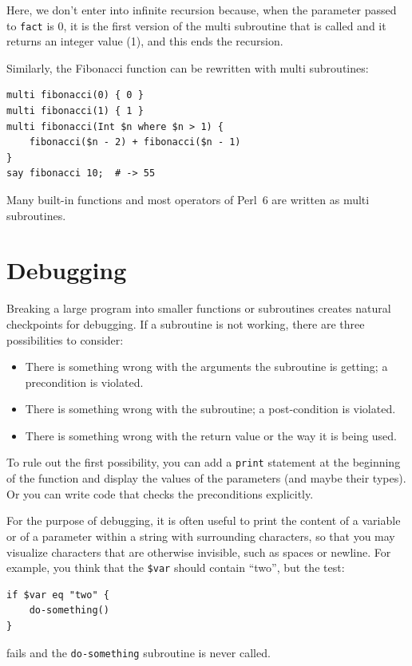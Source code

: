 Here, we don't enter into infinite recursion because, when 
the parameter passed to {\tt fact} is 0, it is the first 
version of the multi subroutine that is called and it returns 
an integer value (1), and this ends the recursion.

Similarly, the Fibonacci function can be rewritten with 
multi subroutines:


\begin{verbatim}
multi fibonacci(0) { 0 }
multi fibonacci(1) { 1 }
multi fibonacci(Int $n where $n > 1) { 
    fibonacci($n - 2) + fibonacci($n - 1) 
}
say fibonacci 10;  # -> 55
\end{verbatim}

Many built-in functions and most operators of Perl~6 are 
written as multi subroutines.

\section{Debugging}
\label{factdebug}

Breaking a large program into smaller functions or subroutines 
creates natural checkpoints for debugging.  If a subroutine 
is not working, there are three possibilities to consider:

\begin{itemize}

\item There is something wrong with the arguments the subroutine
is getting; a precondition is violated.

\item There is something wrong with the subroutine; a post-condition
is violated.

\item There is something wrong with the return value or the
way it is being used.

\end{itemize}

To rule out the first possibility, you can add a {\tt print} statement
at the beginning of the function and display the values of the
parameters (and maybe their types).  Or you can write code
that checks the preconditions explicitly.

For the purpose of debugging, it is often useful to print the content of a variable or of a parameter within a string with surrounding characters, so that you may visualize characters that are otherwise invisible, such as spaces or newline. For example, you think that the \verb'$var' should contain ``two'', but the test:
\begin{verbatim}
if $var eq "two" {
    do-something()
}
\end{verbatim}
%
fails and the {\tt do-something} subroutine is never called.

